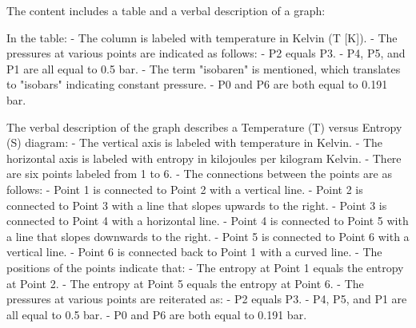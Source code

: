 The content includes a table and a verbal description of a graph:

In the table:
- The column is labeled with temperature in Kelvin (T [K]).
- The pressures at various points are indicated as follows:
  - P2 equals P3.
  - P4, P5, and P1 are all equal to 0.5 bar.
  - The term "isobaren" is mentioned, which translates to "isobars" indicating constant pressure.
  - P0 and P6 are both equal to 0.191 bar.

The verbal description of the graph describes a Temperature (T) versus Entropy (S) diagram:
- The vertical axis is labeled with temperature in Kelvin.
- The horizontal axis is labeled with entropy in kilojoules per kilogram Kelvin.
- There are six points labeled from 1 to 6.
- The connections between the points are as follows:
  - Point 1 is connected to Point 2 with a vertical line.
  - Point 2 is connected to Point 3 with a line that slopes upwards to the right.
  - Point 3 is connected to Point 4 with a horizontal line.
  - Point 4 is connected to Point 5 with a line that slopes downwards to the right.
  - Point 5 is connected to Point 6 with a vertical line.
  - Point 6 is connected back to Point 1 with a curved line.
- The positions of the points indicate that:
  - The entropy at Point 1 equals the entropy at Point 2.
  - The entropy at Point 5 equals the entropy at Point 6.
- The pressures at various points are reiterated as:
  - P2 equals P3.
  - P4, P5, and P1 are all equal to 0.5 bar.
  - P0 and P6 are both equal to 0.191 bar.
